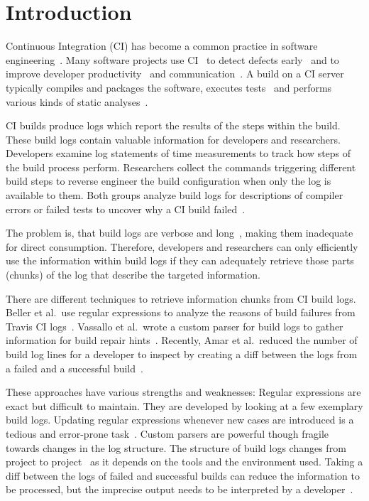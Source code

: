 \documentclass[\myrootdir/main.tex]{subfiles}
\begin{document}
\chapter{Introduction}
Continuous Integration (CI) has become a common practice in software engineering~\cite{hilton2016usage}.
Many software projects use CI~\cite{hilton2016usage,staahl2014modeling,beller2017oops} to detect defects early~\cite{vasilescu2015quality,duvall2007continuous} and to improve developer productivity~\cite{miller2008hundred,hilton2016usage} and communication~\cite{downs2012ambient}.
A build on a CI server typically compiles and packages the software, executes tests~\cite{beller2017oops} and performs various kinds of static analyses~\cite{zampetti2017open}.

CI builds produce logs which report the results of the steps within the build.
These build logs contain valuable information for developers and researchers.
Developers examine log statements of time measurements to track how steps of the build process perform.
Researchers collect the commands triggering different build steps to reverse engineer the build configuration when only the log is available to them.
Both groups analyze build logs for descriptions of compiler errors or failed tests to uncover why a CI build failed~\cite{beller2017oops,seo2014programmers,vassallo2017a-tale}.

The problem is, that build logs are verbose and long~\cite{beller2017oops}, making them inadequate for direct consumption.
Therefore, developers and researchers can only efficiently use the information within build logs if they can adequately retrieve those parts (chunks) of the log that describe the targeted information.

There are different techniques to retrieve information chunks from CI build logs.
Beller et al.\ use regular expressions to analyze the reasons of build failures from Travis CI logs~\cite{beller2017oops}.
Vassallo et al.\ wrote a custom parser for build logs to gather information for build repair hints~\cite{vassallo2018un-break}.
Recently, Amar et al.\ reduced the number of build log lines for a developer to inspect by creating a diff between the logs from a failed and a successful build~\cite{amar2019mining}.

These approaches have various strengths and weaknesses:
Regular expressions are exact but difficult to maintain.
They are developed by looking at a few exemplary build logs.
Updating regular expressions whenever new cases are introduced is a tedious and error-prone task~\cite{michael2019regexes}.
Custom parsers are powerful though fragile towards changes in the log structure.
The structure of build logs changes from project to project~\cite{staahl2014modeling} as it depends on the tools and the environment used.
Taking a diff between the logs of failed and successful builds can reduce the information to be processed, but the imprecise output needs to be interpreted by a developer~\cite{amar2019mining}.
\end{document}

